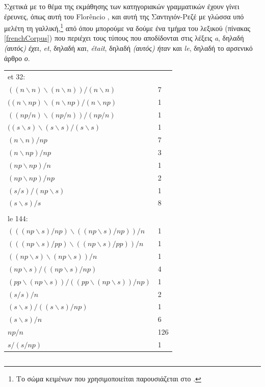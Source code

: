\documentclass [a4paper,11pt] {book}
\theoremstyle{definition}
\theoremstyle{definition}
\begin{document}
Σχετικά με το θέμα της εκμάθησης των κατηγοριακών γραμματικών έχουν γίνει έρευνες, όπως αυτή του Florêncio \citep{costathesis}, και αυτή της Σαντιγιόν-Ρεζέ \citep{fleur} με γλώσσα υπό μελέτη τη γαλλική,\footnote{Το σώμα κειμένων που χρησιμοποιείται παρουσιάζεται στο \citep{citeulike:7469310}.} από όπου μπορούμε να δούμε ένα τμήμα του λεξικού (πίνακας \ref{frenchCorpus}) που περιέχει τους τύπους που αποδίδονται στις λέξεις \textit{a}, δηλαδή \textit{(αυτός) έχει}, \textit{et}, δηλαδή \textit{και}, \textit{était}, δηλαδή \textit{(αυτός) ήταν} και \textit{le}, δηλαδή το αρσενικό άρθρο \textit{ο}.
\begin{table}
\centering
\begin{tabular}{ll}
et 32: \\
$( (n\backslash n)\backslash (n\backslash n))/(n\backslash n) $ & 7 \\
$( (n\backslash np)\backslash (n\backslash np) / (n\backslash np) $ & 1 \\
$( (np/n) \backslash (np/n) )/ (np/n)  $ & 1 \\
$( (s\backslash s)\backslash (s\backslash s) / (s\backslash s)$ & 1 \\
$(n\backslash n)/np$ & 7 \\
$(n\backslash np)/np$ & 3 \\
$(np\backslash np)/n$ & 1 \\
$(np\backslash np)/np$ & 2 \\
$(s/s)/(np\backslash s)$ & 1 \\
$(s\backslash s)/s$ & 8 \\
\\
le 144: \\
$(( (np\backslash s)/np)\backslash ((np\backslash s)/np))/n$ & 1 \\
$(( (np\backslash s)/pp)\backslash ((np\backslash s)/pp))/n$ & 1 \\
$((np\backslash s) \backslash (np\backslash s))/n$ & 1 \\
$(np\backslash s) /( (np\backslash s)/np)$ & 4 \\
$(pp\backslash (np\backslash s))/((pp\backslash (np\backslash s))/np)$ & 1 \\
$(s/s)/n$ & 2 \\
$(s\backslash s)/((s\backslash s)/np)$ & 1 \\
$(s\backslash s)/n$ & 6 \\
$np/n$ & 126 \\
$s/(s/np)$ & 1
\end{tabular}
\begin{tabular}{ll}

\end{tabular}
\end{table}
\end{document}
